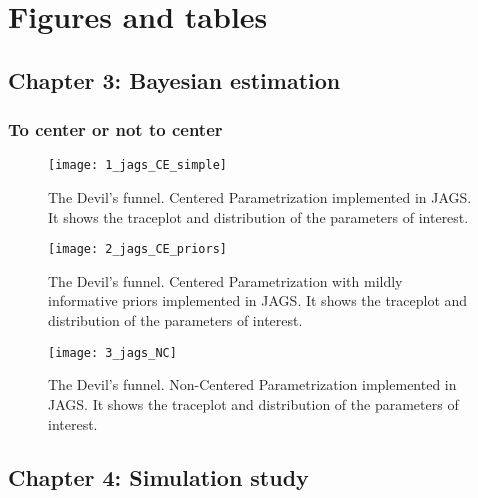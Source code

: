 \chapter{Figures and tables} \label{appB:additional}


\section{Chapter 3: Bayesian estimation} \label{appB1:chapter3}

\subsection{To center or not to center} \label{appB1:noncenter}
%
\begin{figure}[H]
	\centering
	\texttt{[image: 1\_jags\_CE\_simple]}
	\caption[The Devil's funnel. Centered Parametrization. JAGS]%
	{The Devil's funnel. Centered Parametrization implemented in JAGS. It shows the traceplot and distribution of the parameters of interest.}
	\label{fig:devil_CE_simple_jags}
\end{figure}
%
\begin{figure}[H]
	\centering
	\texttt{[image: 2\_jags\_CE\_priors]}
	\caption[The Devil's funnel. Centered Parametrization with mildly informative priors. JAGS]%
	{The Devil's funnel. Centered Parametrization with mildly informative priors implemented in JAGS. It shows the traceplot and distribution of the parameters of interest.}
	\label{fig:devil_CE_prior_jags}
\end{figure}
%
\begin{figure}[H]
	\centering
	\texttt{[image: 3\_jags\_NC]}
	\caption[The Devil's funnel. Non-Centered Parametrization. JAGS]%
	{The Devil's funnel. Non-Centered Parametrization implemented in JAGS. It shows the traceplot and distribution of the parameters of interest.}
	\label{fig:devil_CE_NC_jags}
\end{figure}




\section{Chapter 4: Simulation study} \label{appB2:chapter4}

